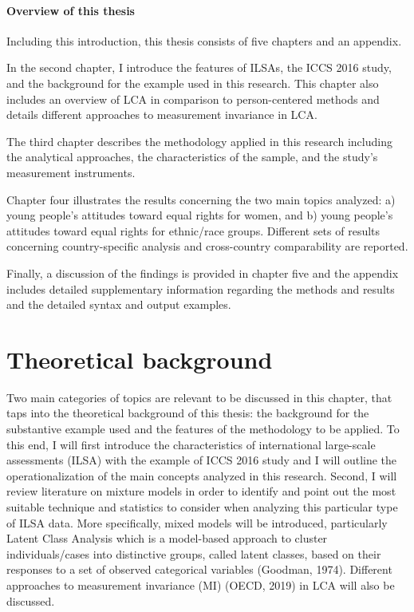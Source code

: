 \documentclass[12pt,a4paper,oneside]{reedthesis}
\begin{document}
\newpage

\hypertarget{overview-of-this-thesis}{%
\subsubsection{Overview of this thesis}\label{overview-of-this-thesis}}

Including this introduction, this thesis consists of five chapters and an appendix.

In the second chapter, I introduce the features of ILSAs, the ICCS 2016 study, and the background for the example used in this research. This chapter also includes an overview of LCA in comparison to person-centered methods and details different approaches to measurement invariance in LCA.

The third chapter describes the methodology applied in this research including the analytical approaches, the characteristics of the sample, and the study's measurement instruments.

Chapter four illustrates the results concerning the two main topics analyzed: a) young people's attitudes toward equal rights for women, and b) young people's attitudes toward equal rights for ethnic/race groups. Different sets of results concerning country-specific analysis and cross-country comparability are reported.

Finally, a discussion of the findings is provided in chapter five and the appendix includes detailed supplementary information regarding the methods and results and the detailed syntax and output examples.

\clearpage

\hypertarget{theoretical-background}{%
\chapter{Theoretical background}\label{theoretical-background}}

Two main categories of topics are relevant to be discussed in this chapter, that taps into the theoretical background of this thesis: the background for the substantive example used and the features of the methodology to be applied. To this end, I will first introduce the characteristics of international large-scale assessments (ILSA) with the example of ICCS 2016 study and I will outline the operationalization of the main concepts analyzed in this research. Second, I will review literature on mixture models in order to identify and point out the most suitable technique and statistics to consider when analyzing this particular type of ILSA data. More specifically, mixed models will be introduced, particularly Latent Class Analysis which is a model-based approach to cluster individuals/cases into distinctive groups, called latent classes, based on their responses to a set of observed categorical variables (Goodman, 1974). Different approaches to measurement invariance (MI) (OECD, 2019) in LCA will also be discussed.
\end{document}
